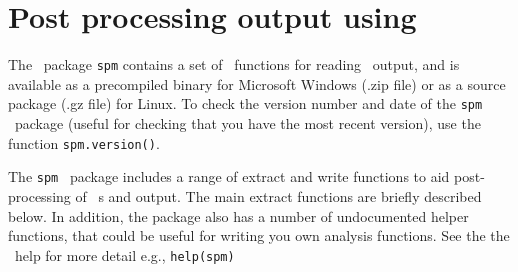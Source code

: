 \section{Post processing output using \R \label{sec:post-processing}}

The \R\ package \texttt{spm} contains a set of \R\ functions for reading \SPM\ output, and is available as a precompiled binary for Microsoft Windows (.zip file) or as a source package (.gz file) for Linux. To check the version number and date of the \texttt{spm} \R\ package (useful for checking that you have the most recent version), use the function \texttt{spm.version()}.

The \texttt{spm} \R\ package includes a range of extract and write functions to aid post-processing of \SPM\ \config s and output. The main extract functions are briefly described below. In addition, the package also has a number of undocumented helper functions, that could be useful for writing you own analysis functions. See the the \R\ help for more detail e.g., \texttt{help(spm)}

